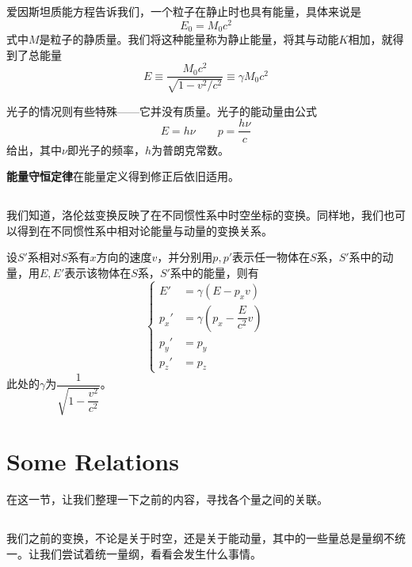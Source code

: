爱因斯坦质能方程告诉我们，一个粒子在静止时也具有能量，具体来说是
\begin{equation}
	E_0=M_0c^2
\end{equation}
式中$M$是粒子的静质量。我们将这种能量称为静止能量，将其与动能$K$相加，就得到了总能量
\begin{equation}
	E\equiv \frac{M_0c^2}{\sqrt{1-v^2/c^2}}\equiv \gamma M_0 c^2
\end{equation}

光子的情况则有些特殊——它并没有质量。光子的能动量由公式
\begin{equation}
	E=h\nu\qquad p=\dfrac{h\nu}{c}
\end{equation}
给出，其中$\nu$即光子的频率，$h$为普朗克常数。

\textbf{能量守恒定律}在能量定义得到修正后依旧适用。
\subsection[不同惯性系中的转换]{}

我们知道，洛伦兹变换反映了在不同惯性系中时空坐标的变换。同样地，我们也可以得到在不同惯性系中相对论能量与动量的变换关系。
\begin{law}
	设$S'$系相对$S$系有$x$方向的速度$v$，并分别用$p,p'$表示任一物体在$S$系，$S'$系中的动量，用$E,E'$表示该物体在$S$系，$S'$系中的能量，则有
	\[\left\{\begin{aligned}
		E'&=\gamma(E-p_xv)\\
		p_x'&=\gamma(p_x-\dfrac{E}{c^2}v)\\
		p_y'&=p_y\\
		p_z'&=p_z
	\end{aligned}\right.\]
	此处的$\gamma$为$\dfrac{1}{\sqrt{1-\dfrac{v^2}{c^2}}}$。
\end{law}
\section[一些关联]{Some Relations}
在这一节，让我们整理一下之前的内容，寻找各个量之间的关联。
\subsection[量纲统一]{}
我们之前的变换，不论是关于时空，还是关于能动量，其中的一些量总是量纲不统一。让我们尝试着统一量纲，看看会发生什么事情。

